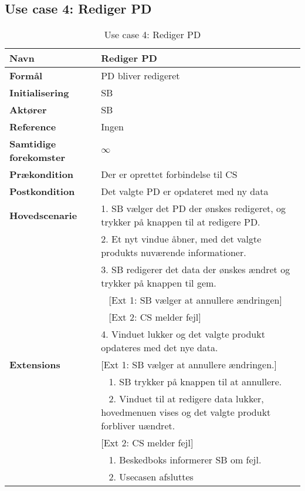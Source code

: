\subsection{Use case 4: Rediger \gls{PD}}


\begin{table}[H]
\begin{tabularx}{\textwidth}{|l|X|}
\hline
\textbf{Navn}					& Rediger \gls{PD} \\\hline
\textbf{Formål}					& \gls{PD} bliver redigeret \\\hline
\textbf{Initialisering}			& \gls{SB} \\\hline
\textbf{Aktører}				& \gls{SB} \\\hline
\textbf{Reference}				& Ingen \\\hline
								
\textbf{Samtidige forekomster}	& $\infty$ \\
\hline
\textbf{Prækondition}			& Der er oprettet forbindelse til \gls{CS} \\
\hline
\textbf{Postkondition}			& Det valgte \gls{PD} er opdateret med ny data \\
\hline
\textbf{Hovedscenarie}			& 1. \gls{SB} vælger det \gls{PD} der ønskes redigeret, og trykker på knappen til at redigere \gls{PD}.\\
								& 2. Et nyt vindue åbner, med det valgte produkts nuværende informationer.\\
								& 3. \gls{SB} redigerer det data der ønskes ændret og trykker på knappen til gem.\\
								& ~ [Ext 1: \gls{SB} vælger at annullere ændringen]\\
								& ~ [Ext 2: \gls{CS} melder fejl]\\
								& 4. Vinduet lukker og det valgte produkt opdateres med det nye data.\\
\hline
\textbf{Extensions}				& [Ext 1: \gls{SB} vælger at annullere ændringen.] \\
								& ~ 1. \gls{SB} trykker på knappen til at annullere.\\
								& ~ 2. Vinduet til at redigere data lukker, hovedmenuen vises og det valgte produkt forbliver uændret.\\
								& [Ext 2: \gls{CS} melder fejl] \\
								& ~ 1. Beskedboks informerer \gls{SB} om fejl. \\
								& ~ 2. Usecasen afsluttes \\\hline
								
\end{tabularx}
\caption{Use case 4: Rediger \gls{PD}}
\label{tab:UCrp}
\end{table}